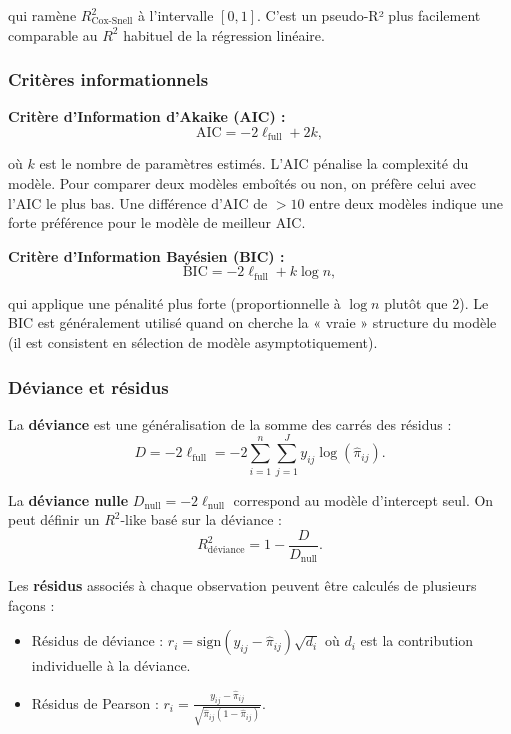\documentclass[12pt,a4paper]{article}
\begin{document}
qui ramène $R^2_{\text{Cox-Snell}}$ à l'intervalle $[0, 1]$. C'est un pseudo-R² plus facilement comparable au $R^2$ habituel de la régression linéaire.

\subsubsection{Critères informationnels}

\textbf{Critère d'Information d'Akaike (AIC) :}
\begin{equation}\label{eq:aic}
\text{AIC} = -2 \ell_{\text{full}} + 2k,
\end{equation}

où $k$ est le nombre de paramètres estimés. L'AIC pénalise la complexité du modèle. Pour comparer deux modèles emboîtés ou non, on préfère celui avec l'AIC le plus bas. Une différence d'AIC de $> 10$ entre deux modèles indique une forte préférence pour le modèle de meilleur AIC.

\textbf{Critère d'Information Bayésien (BIC) :}
\begin{equation}\label{eq:bic}
\text{BIC} = -2 \ell_{\text{full}} + k \log n,
\end{equation}

qui applique une pénalité plus forte (proportionnelle à $\log n$ plutôt que $2$). Le BIC est généralement utilisé quand on cherche la « vraie » structure du modèle (il est consistent en sélection de modèle asymptotiquement).

\subsubsection{Déviance et résidus}

La \textbf{déviance} est une généralisation de la somme des carrés des résidus :
\begin{equation}\label{eq:deviance}
D = -2 \ell_{\text{full}} = -2 \sum_{i=1}^{n} \sum_{j=1}^{J} y_{ij} \log(\widehat{\pi}_{ij}).
\end{equation}

La \textbf{déviance nulle} $D_{\text{null}} = -2 \ell_{\text{null}}$ correspond au modèle d'intercept seul. On peut définir un $R^2$-like basé sur la déviance :
\begin{equation}
R^2_{\text{déviance}} = 1 - \frac{D}{D_{\text{null}}}.
\end{equation}

Les \textbf{résidus} associés à chaque observation peuvent être calculés de plusieurs façons :
\begin{itemize}
    \item Résidus de déviance : $r_i = \text{sign}(y_{ij} - \widehat{\pi}_{ij}) \sqrt{d_i}$ où $d_i$ est la contribution individuelle à la déviance.
    \item Résidus de Pearson : $r_i = \frac{y_{ij} - \widehat{\pi}_{ij}}{\sqrt{\widehat{\pi}_{ij}(1 - \widehat{\pi}_{ij})}}$.
\end{itemize}
\end{document}
